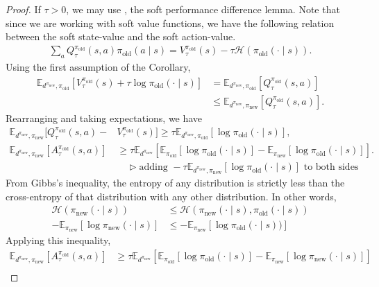 \documentclass[twoside,11pt]{article}
\newcommand{\Ex}{\mathbb{E}}
\newcommand{\entropy}{\mathcal{H}}
\newcommand{\pinew}{{\pi_\mathrm{new}}}
\newcommand{\piold}{{\pi_\mathrm{old}}}
\begin{document}
\begin{proof}
If $\tau > 0$, we may use , the soft performance difference lemma. Note that since we are working with soft value functions, we have the following relation between the soft state-value and the soft action-value. 
\begin{align*}
    \sum_a Q_\tau^\piold(s, a) \piold(a \mid s) = V_\tau^\piold(s) - \tau \entropy(\piold(\cdot \mid s)).
\end{align*}
Using the first assumption of the Corollary,
\begin{align*}
    \Ex_{d^\pinew, \piold}[V_\tau^\piold(s) + \tau \log\piold(\cdot \mid s)] &= \Ex_{d^\pinew, \piold}[ Q_\tau^\piold(s, a)] \\
    &\leq \Ex_{d^\pinew, \pinew}[ Q_\tau^\piold(s, a)].
\end{align*}
Rearranging and taking expectations, we have
\begin{align*}
    \Ex_{d^\pinew, \pinew}[Q_\tau^\piold(s, a) -& V_\tau^\piold(s)] \geq \tau \Ex_{d^\pinew, \piold}[\log \piold(\cdot \mid s)],\\
    \Ex_{d^\pinew, \pinew}[A_\tau^\piold(s, a)] &\geq \tau \Ex_{d^\pinew}[\Ex_{\piold}[\log \piold(\cdot \mid s)] - \Ex_{\pinew}[\log \piold(\cdot \mid s)]].\\
    &\quad \triangleright \text{adding } -\tau \Ex_{d^\pinew, \pinew}[\log \piold(\cdot \mid s)] \text{ to both sides}
\end{align*}
From Gibbs's inequality, the entropy of any distribution is strictly less than the cross-entropy of that distribution with any other distribution. In other words,
\begin{align*}
    \entropy(\pinew(\cdot \mid s)) &\leq \entropy(\pinew(\cdot \mid s), \piold(\cdot \mid s))\\
    -\Ex_\pinew[\log \pinew(\cdot \mid s)] &\leq - \Ex_\pinew[\log \piold(\cdot \mid s))]
\end{align*}
Applying this inequality,
\begin{align*}
    \Ex_{d^\pinew, \pinew}[A_\tau^\piold(s, a)] &\geq \tau \Ex_{d^\pinew}[\Ex_{\piold}[\log \piold(\cdot \mid s)] - \Ex_{\pinew}[\log \pinew(\cdot \mid s)]]\\

\end{align*}
\end{proof}
\end{document}
